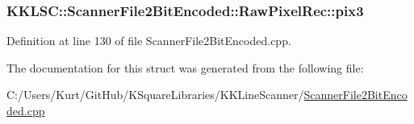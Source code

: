 \subsubsection[{\texorpdfstring{pix3}{pix3}}]{ K\+K\+L\+S\+C\+::\+Scanner\+File2\+Bit\+Encoded\+::\+Raw\+Pixel\+Rec\+::pix3}\hypertarget{struct_scanner_file2_bit_encoded_1_1_raw_pixel_rec_ac9797ff0f134a3b228043abb3c00a4d4}{}\label{struct_scanner_file2_bit_encoded_1_1_raw_pixel_rec_ac9797ff0f134a3b228043abb3c00a4d4}


Definition at line 130 of file Scanner\+File2\+Bit\+Encoded.\+cpp.



The documentation for this struct was generated from the following file\+:\begin{DoxyCompactItemize}
\item 
C\+:/\+Users/\+Kurt/\+Git\+Hub/\+K\+Square\+Libraries/\+K\+K\+Line\+Scanner/\hyperlink{_scanner_file2_bit_encoded_8cpp}{Scanner\+File2\+Bit\+Encoded.\+cpp}\end{DoxyCompactItemize}
